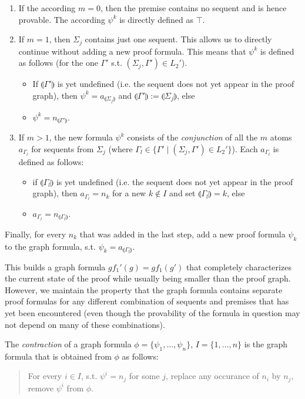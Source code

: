 \documentclass{llncs}
\newcommand{\ind}[1]{\llparenthesis #1 \rrparenthesis}
\begin{document}
\begin{enumerate}
\item If the according $m=0$, then the premise contains no sequent and is hence provable. The according $\psi^k$ is
directly defined as $\top$.
\item If $m=1$, then $\Sigma_j$ contains just one sequent. This allows us to directly continue without adding
a new proof formula. This means that $\psi^k$ is defined as follows
(for the one $\Gamma'$ s.t. $(\Sigma_j,\Gamma')\in L_2'$).
\begin{itemize}
\item If $\ind{\Gamma'}$ is yet undefined (i.e. the sequent does not yet appear in the
proof graph), then $\psi^k=a_{\ind{\Sigma_j}}$ and $\ind{\Gamma'}:=\ind{\Sigma_j}$, else
\item $\psi^k=n_{\ind{\Gamma'}}$.
\end{itemize}
\item If $m>1$, the new formula $\psi^k$ consists of the \emph{conjunction} of all the $m$ atoms
$a_{\Gamma_l}$ for sequents from $\Sigma_j$ (where $\Gamma_l \in \{\Gamma' \mid (\Sigma_j,\Gamma')\in L_2'\}$).
Each $a_{\Gamma_l}$ is defined as follows:
\begin{itemize}
\item if $\ind{\Gamma_l}$ is yet undefined (i.e. the sequent does not yet appear in the proof graph),
then $a_{\Gamma_l} = n_k$ for a new $k\notin I$ and set $\ind{\Gamma_{l}}=k$, else
\item $a_{\Gamma_l} = n_{\ind{\Gamma_l}}$.
\end{itemize}
\end{enumerate}
Finally, for every $n_k$ that was added in the last step, add a new proof formula $\psi_k$ to the graph formula,
s.t. $\psi_k=a_{\ind{\Gamma_l}}$.

This builds a graph formula $gf_1'(g)=gf_1(g')$ that completely characterizes the current state of the proof while
usually being smaller than the proof graph. However, we maintain the property that the
graph formula contains separate proof formulas for any different combination of sequents and
premises that has yet been encountered (even though the provability of the formula in question may not
depend on many of these combinations).

\begin{definition}
The \emph{contraction} of a graph formula $\phi=\{\psi_1,\ldots,\psi_n\}$, $I=\{1,\ldots,n\}$ is the graph formula that is obtained from 
$\phi$ as follows:
\begin{quote}
For every $i\in I$, s.t. $\psi^i=n_j$ for some $j$, replace any occurance of $n_i$ by $n_j$, remove $\psi^i$ from $\phi$.
\end{quote}
\end{definition}
\end{document}
